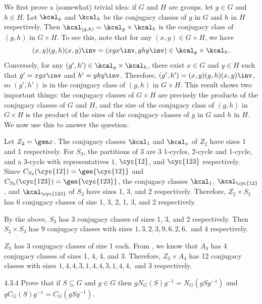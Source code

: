\begin{sol}
	We first prove a (somewhat) trivial idea: if $G$ and $H$ are groups, let $g \in G$ and $h \in H$.
	Let $\kcal_g$ and $\kcal_h$ be the conjugacy classes of $g$ in $G$ and $h$ in $H$ respectively.
	Then $\kcal_{(g,h)} = \kcal_g \times \kcal_h$ is the conjugacy class of $(g,h)$ in $G \times H$.
	To see this, note that for any $(x,y) \in G \times H$, we have
	\[
		(x,y)(g,h)(x,y)\inv = (xgx\inv, yhy\inv) \in \kcal_g \times \kcal_h.
	\]
	Conversely, for any $(g', h') \in \kcal_g \times \kcal_h$, there exist $x \in G$ and $y \in H$ such that $g' = xgx\inv$ and $h' = yhy\inv$.
	Therefore, $(g', h') = (x,y)(g,h)(x,y)\inv$, so $(g', h')$ is in the conjugacy class of $(g,h)$ in $G \times H$.
	This result shows two important things: the conjugacy classes of $G \times H$ are precisely the products of the conjugacy classes of $G$ and $H$, and the size of the conjugacy class of $(g,h)$ in $G \times H$ is the product of the sizes of the conjugacy classes of $g$ in $G$ and $h$ in $H$.
	We now use this to answer the question.
	\begin{subexercises}
		\item Let $Z_2 = \gen x$.
		The conjugacy classes $\kcal_1$ and $\kcal_x$ of $Z_2$ have sizes 1 and 1 respectively.
		For $S_3$, the partitions of 3 are 3 1-cycles, 2-cycle and 1-cycle, and a 3-cycle with representatives $1$, $\cyc{1 2}$, and $\cyc{1 2 3}$ respectively.
		Since $C_{S_3}(\cyc{1 2}) = \gen{\cyc{1 2}}$ and $C_{S_3}(\cyc{1 2 3}) = \gen{\cyc{1 2 3}}$, the conjugacy classes $\kcal_1$, $\kcal_{\cyc{1 2}}$, and $\kcal_{\cyc{1 2 3}}$ of $S_3$ have sizes 1, 3, and 2 respectively.
		Therefore, $Z_2 \times S_3$ has 6 conjugacy classes of size 1, 3, 2, 1, 3, and 2 respectively.
		\item By the above, $S_3$ has 3 conjugacy classes of sizes 1, 3, and 2 respectively.
		Then $S_3 \times S_3$ has 9 conjugacy classes with sizes $1, 3, 2, 3, 9, 6, 2, 6,$ and $4$ respectively.
		\item $Z_3$ has 3 conjugacy classes of size 1 each.
		From , we know that $A_4$ has 4 conjugacy classes of sizes 1, 4, 4, and 3.
		Therefore, $Z_3 \times A_4$ has 12 conjugacy classes with sizes $1, 4, 4, 3, 1, 4, 4, 3, 1, 4, 4,$ and $3$ respectively. \qedhere
	\end{subexercises}
\end{sol}

\begin{exercise}{4.3.4}
	Prove that if $S \subseteq G$ and $g \in G$ then $gN_G(S)g^{-1} = N_G(gSg^{-1})$ and $gC_G(S)g^{-1} = C_G(gSg^{-1}).$
\end{exercise}

